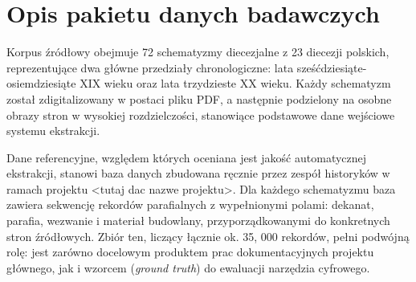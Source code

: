 \section{Opis pakietu danych badawczych}\label{sec:pakiet_danych}

Korpus źródłowy obejmuje 72 schematyzmy diecezjalne z 23 diecezji polskich, reprezentujące dwa główne przedziały chronologiczne: lata sześćdziesiąte-osiemdziesiąte XIX wieku oraz lata trzydzieste XX wieku.
Każdy schematyzm został zdigitalizowany w postaci pliku PDF, a następnie podzielony na osobne obrazy stron w wysokiej rozdzielczości, stanowiące podstawowe dane wejściowe systemu ekstrakcji.

Dane referencyjne, względem których oceniana jest jakość automatycznej ekstrakcji, stanowi baza danych zbudowana ręcznie przez zespół historyków w ramach projektu <tutaj dac nazwe projektu>.
Dla każdego schematyzmu baza zawiera sekwencję rekordów parafialnych z wypełnionymi polami: dekanat, parafia, wezwanie i materiał budowlany, przyporządkowanymi do konkretnych stron źródłowych.
Zbiór ten, liczący łącznie ok. 35, 000 rekordów, pełni podwójną rolę: jest zarówno docelowym produktem prac dokumentacyjnych projektu głównego, jak i wzorcem (\textit{ground truth}) do ewaluacji narzędzia cyfrowego.